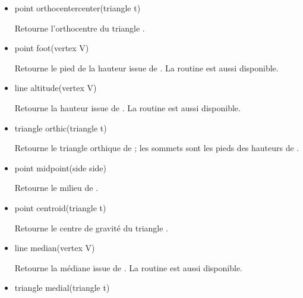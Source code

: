 \documentclass[pdftex]{article}
\begin{document}
\begin{itemize}
\item {}
  \begin{Vcolor}
    point orthocentercenter(triangle t)
  \end{Vcolor}
  Retourne l'orthocentre du triangle .
\item {}
  \begin{Vcolor}
    point foot(vertex V)
  \end{Vcolor}
  Retourne le pied de la hauteur issue de . La routine
   est aussi disponible.
\item {}
  \begin{Vcolor}
    line altitude(vertex V)
  \end{Vcolor}
  Retourne la hauteur issue de . La routine
   est aussi disponible.
\item {}
  \begin{Vcolor}
    triangle orthic(triangle t)
  \end{Vcolor}
  Retourne le triangle orthique de ; les sommets sont les pieds des hauteurs
  de .
\item {}
  \begin{Vcolor}
    point midpoint(side side)
  \end{Vcolor}
  Retourne le milieu de .
\item {}
  \begin{Vcolor}
    point centroid(triangle t)
  \end{Vcolor}
  Retourne le centre de gravité du triangle .
\item {}
  \begin{Vcolor}
    line median(vertex V)
  \end{Vcolor}
  Retourne la médiane issue de . La routine
   est aussi disponible.
\item {}
  \begin{Vcolor}
    triangle medial(triangle t)
  \end{Vcolor}

\end{itemize}
\end{document}
